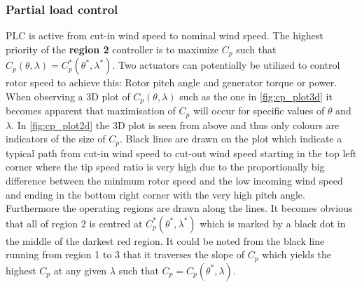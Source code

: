 \subsubsection{Partial load control} \label{sec:theory_ctrl_plc}
PLC is active from cut-in wind speed to nominal wind speed. The highest priority of the \textbf{region 2} controller is to maximize $ C_p $ such that $ C_p(\theta, \lambda) = C_p^*(\theta^*, \lambda^*) $. Two actuators can potentially be utilized to control rotor speed to achieve this: Rotor pitch angle and generator torque or power. When observing a 3D plot of $ C_p(\theta, \lambda) $ such as the one in \cref{fig:cp_plot3d} it becomes apparent that maximisation of $ C_p $ will occur for specific values of $ \theta $ and $ \lambda $. In \cref{fig:cp_plot2d} the 3D plot is seen from above and thus only colours are indicators of the size of $ C_p $. Black lines are drawn on the plot which indicate a typical path from cut-in wind speed to cut-out wind speed starting in the top left corner where the tip speed ratio is very high due to the proportionally big difference between the minimum rotor speed and the low incoming wind speed and ending in the bottom right corner with the very high pitch angle. Furthermore the operating regions are drawn along the lines. It becomes obvious that all of region 2 is centred at $ C_p^*(\theta^*, \lambda^*) $ which is marked by a black dot in the middle of the darkest red region. It could be noted from the black line running from region 1 to 3 that it traverses the slope of $ C_p $ which yields the highest $ C_p $ at any given $ \lambda $ such that $ C_p = C_p(\theta^*, \lambda) $.
